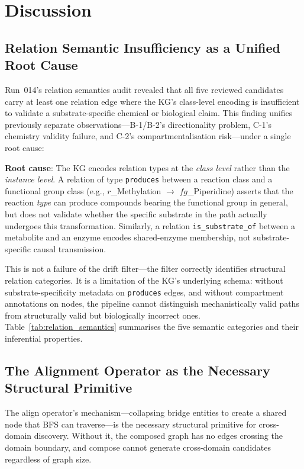 \section{Discussion}
\label{sec:discussion}

\subsection{Relation Semantic Insufficiency as a Unified Root Cause}

Run~014's relation semantics audit revealed that all five reviewed candidates carry
at least one relation edge where the KG's class-level encoding is insufficient to
validate a substrate-specific chemical or biological claim.
This finding unifies previously separate observations---B-1/B-2's directionality
problem, C-1's chemistry validity failure, and C-2's compartmentalisation risk---under
a single root cause:

\medskip
\noindent\textbf{Root cause}: The KG encodes relation types at the \textit{class level}
rather than the \textit{instance level}.
A relation of type \texttt{produces} between a reaction class and a functional group
class (e.g., $r$\_Methylation $\to$ $fg$\_Piperidine) asserts that the reaction
\textit{type} can produce compounds bearing the functional group in general, but does
not validate whether the specific substrate in the path actually undergoes this
transformation.
Similarly, a relation \texttt{is\_substrate\_of} between a metabolite and an enzyme
encodes shared-enzyme membership, not substrate-specific causal transmission.

\medskip
This is not a failure of the drift filter---the filter correctly identifies structural
relation categories.
It is a limitation of the KG's underlying schema: without substrate-specificity
metadata on \texttt{produces} edges, and without compartment annotations on nodes,
the pipeline cannot distinguish mechanistically valid paths from structurally valid
but biologically incorrect ones.
Table~\ref{tab:relation_semantics} summarises the five semantic categories
and their inferential properties.



\subsection{The Alignment Operator as the Necessary Structural Primitive}

The align operator's mechanism---collapsing bridge entities to create a shared node
that BFS can traverse---is the necessary structural primitive for cross-domain discovery.
Without it, the composed graph has no edges crossing the domain boundary,
and compose cannot generate cross-domain candidates regardless of graph size.

